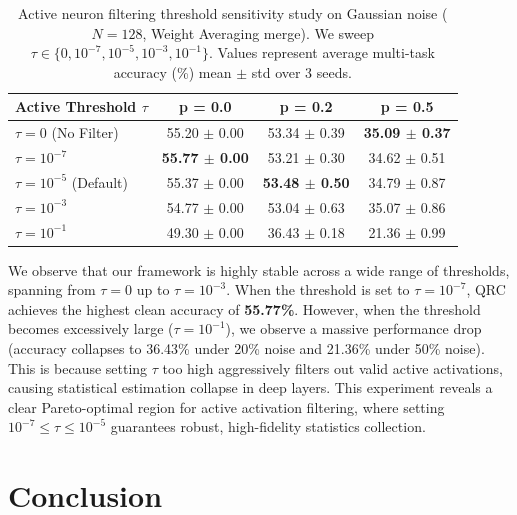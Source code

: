 \documentclass{article}
\theoremstyle{plain}
\theoremstyle{definition}
\theoremstyle{remark}
\begin{document}
\begin{table}[t]
  \caption{Active neuron filtering threshold sensitivity study on Gaussian noise ($N=128$, Weight Averaging merge). We sweep $\tau \in \{0, 10^{-7}, 10^{-5}, 10^{-3}, 10^{-1}\}$. Values represent average multi-task accuracy (\%) mean $\pm$ std over 3 seeds.}
  \label{tab:active_threshold}
  \vskip 0.1in
  \begin{center}
    \begin{small}
      \begin{tabular}{lccc}
        \toprule
        \textbf{Active Threshold $\tau$} & \textbf{p = 0.0} & \textbf{p = 0.2} & \textbf{p = 0.5} \\
        \midrule
        $\tau = 0$ (No Filter) & 55.20 $\pm$ 0.00 & 53.34 $\pm$ 0.39 & \textbf{35.09 $\pm$ 0.37} \\
        $\tau = 10^{-7}$ & \textbf{55.77 $\pm$ 0.00} & 53.21 $\pm$ 0.30 & 34.62 $\pm$ 0.51 \\
        $\tau = 10^{-5}$ (Default) & 55.37 $\pm$ 0.00 & \textbf{53.48 $\pm$ 0.50} & 34.79 $\pm$ 0.87 \\
        $\tau = 10^{-3}$ & 54.77 $\pm$ 0.00 & 53.04 $\pm$ 0.63 & 35.07 $\pm$ 0.86 \\
        $\tau = 10^{-1}$ & 49.30 $\pm$ 0.00 & 36.43 $\pm$ 0.18 & 21.36 $\pm$ 0.99 \\
        \bottomrule
      \end{tabular}
    \end{small}
  \end{center}
  \vskip -0.1in
\end{table}

We observe that our framework is highly stable across a wide range of thresholds, spanning from $\tau = 0$ up to $\tau = 10^{-3}$. When the threshold is set to $\tau = 10^{-7}$, QRC achieves the highest clean accuracy of \textbf{55.77\%}.
However, when the threshold becomes excessively large ($\tau = 10^{-1}$), we observe a massive performance drop (accuracy collapses to 36.43\% under 20\% noise and 21.36\% under 50\% noise). This is because setting $\tau$ too high aggressively filters out valid active activations, causing statistical estimation collapse in deep layers. This experiment reveals a clear Pareto-optimal region for active activation filtering, where setting $10^{-7} \leq \tau \leq 10^{-5}$ guarantees robust, high-fidelity statistics collection.


\section{Conclusion}
\label{sec:conclusion}
\end{document}
